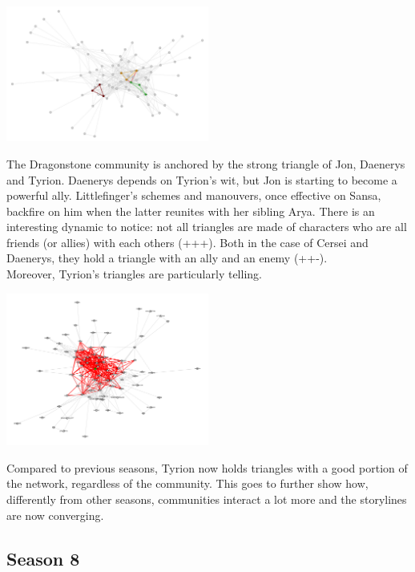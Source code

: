 \documentclass[10pt,twocolumn,letterpaper]{article}
\begin{document}
\begin{center}
    \includegraphics[width=0.5\textwidth]{img/s7/s7_triangles.jpg}
\end{center}

The Dragonstone community is anchored by the strong triangle of Jon, Daenerys and Tyrion. Daenerys depends on Tyrion's wit, but Jon is starting to become a powerful ally. Littlefinger's schemes and manouvers, once effective on Sansa, backfire on him when the latter reunites with her sibling Arya. There is an interesting dynamic to notice: not all triangles are made of characters who are all friends (or allies) with each others (+++). Both in the case of Cersei and Daenerys, they hold a triangle with an ally and an enemy (++-). \\

Moreover, Tyrion's triangles are particularly telling.

\begin{center}
    \includegraphics[width=0.5\textwidth]{img/s7/tyrion_triangles.jpg}
\end{center}

Compared to previous seasons, Tyrion now holds triangles with a good portion of the network, regardless of the community. This goes to further show how, differently from other seasons, communities interact a lot more and the storylines are now converging.


\subsection{Season 8}
\end{document}
